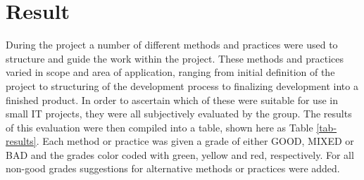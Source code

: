 
\section{Result}

During the project a number of different methods and practices were used to structure and guide the work within the project. These methods and practices varied in scope and area of application, ranging from initial definition of the project to structuring of the development process to finalizing development into a finished product. In order to ascertain which of these were suitable for use in small IT projects, they were all subjectively evaluated by the group. The results of this evaluation were then compiled into a table, shown here as Table \ref{tab-results}. Each method or practice was given a grade of either GOOD, MIXED or BAD and the grades color coded with green, yellow and red, respectively. For all non-good grades suggestions for alternative methods or practices were added.

